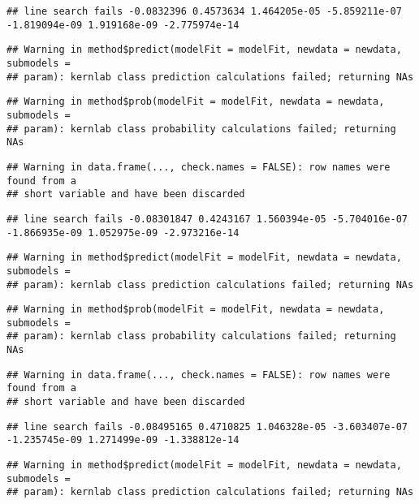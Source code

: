 \documentclass[
]{article}
\begin{document}
\begin{verbatim}
## line search fails -0.0832396 0.4573634 1.464205e-05 -5.859211e-07 -1.819094e-09 1.919168e-09 -2.775974e-14
\end{verbatim}

\begin{verbatim}
## Warning in method$predict(modelFit = modelFit, newdata = newdata, submodels =
## param): kernlab class prediction calculations failed; returning NAs
\end{verbatim}

\begin{verbatim}
## Warning in method$prob(modelFit = modelFit, newdata = newdata, submodels =
## param): kernlab class probability calculations failed; returning NAs
\end{verbatim}

\begin{verbatim}
## Warning in data.frame(..., check.names = FALSE): row names were found from a
## short variable and have been discarded
\end{verbatim}

\begin{verbatim}
## line search fails -0.08301847 0.4243167 1.560394e-05 -5.704016e-07 -1.866935e-09 1.052975e-09 -2.973216e-14
\end{verbatim}

\begin{verbatim}
## Warning in method$predict(modelFit = modelFit, newdata = newdata, submodels =
## param): kernlab class prediction calculations failed; returning NAs
\end{verbatim}

\begin{verbatim}
## Warning in method$prob(modelFit = modelFit, newdata = newdata, submodels =
## param): kernlab class probability calculations failed; returning NAs
\end{verbatim}

\begin{verbatim}
## Warning in data.frame(..., check.names = FALSE): row names were found from a
## short variable and have been discarded
\end{verbatim}

\begin{verbatim}
## line search fails -0.08495165 0.4710825 1.046328e-05 -3.603407e-07 -1.235745e-09 1.271499e-09 -1.338812e-14
\end{verbatim}

\begin{verbatim}
## Warning in method$predict(modelFit = modelFit, newdata = newdata, submodels =
## param): kernlab class prediction calculations failed; returning NAs
\end{verbatim}
\end{document}
